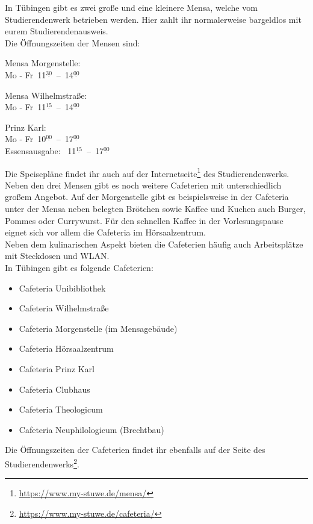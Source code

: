 In Tübingen gibt es zwei große und eine kleinere Mensa, welche vom Studierendenwerk betrieben werden. Hier zahlt ihr normalerweise bargeldlos mit eurem Studierendenausweis.\\
Die Öffnungszeiten der Mensen sind:
\begin{center}

Mensa Morgenstelle:\\
Mo - Fr~11$^{\underline{30}}$~--~14$^{\underline{00}}$

\bigskip

Mensa Wilhelmstraße:\\
Mo - Fr~11$^{\underline{15}}$~--~14$^{\underline{00}}$

\nopagebreak
Prinz Karl:\\
Mo - Fr~10$^{\underline{00}}$~--~17$^{\underline{00}}$\\
Essensausgabe: ~11$^{\underline{15}}$~--~17$^{\underline{00}}$

\end{center}

Die Speisepläne findet ihr auch auf der Internetseite\footnote{\url{https://www.my-stuwe.de/mensa/}} des Studierendenwerks.\\

Neben den drei Mensen gibt es noch weitere Cafeterien mit unterschiedlich großem Angebot. Auf der Morgenstelle gibt es beispielsweise in der Cafeteria unter der Mensa neben belegten Brötchen sowie Kaffee und Kuchen auch Burger, Pommes oder Currywurst. Für den schnellen Kaffee in der Vorlesungspause eignet sich vor allem die Cafeteria im Hörsaalzentrum.\\
Neben dem kulinarischen Aspekt bieten die Cafeterien häufig auch Arbeitsplätze mit Steckdosen und WLAN.\\
In Tübingen gibt es folgende Cafeterien:
\begin{itemize}
	\item Cafeteria Unibibliothek
	\item Cafeteria Wilhelmstraße
	\item Cafeteria Morgenstelle (im Mensagebäude)
	\item Cafeteria Hörsaalzentrum
	\item Cafeteria Prinz Karl
	\item Cafeteria Clubhaus
	\item Cafeteria Theologicum
	\item Cafeteria Neuphilologicum (Brechtbau)
\end{itemize}
Die Öffnungszeiten der Cafeterien findet ihr ebenfalls auf der Seite des Studierendenwerks\footnote{\url{https://www.my-stuwe.de/cafeteria/}}.
